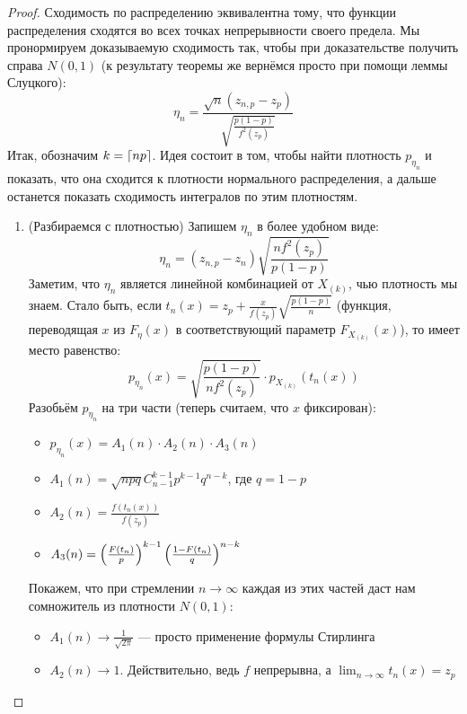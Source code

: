 \begin{proof}
	Сходимость по распределению эквивалентна тому, что функции распределения сходятся во всех точках непрерывности своего предела. Мы пронормируем доказываемую сходимость так, чтобы при доказательстве получить справа $N(0, 1)$ (к результату теоремы же вернёмся просто при помощи леммы Слуцкого):
	\[
		\eta_n = \frac{\sqrt{n}(z_{n, p} - z_p)}{\sqrt{\frac{p(1 - p)}{f^2(z_p)}}}
	\]
	Итак, обозначим $k = \left\lceil np\right\rceil$. Идея состоит в том, чтобы найти плотность $p_{\eta_n}$ и показать, что она сходится к плотности нормального распределения, а дальше останется показать сходимость интегралов по этим плотностям.
	\begin{enumerate}
		\item (Разбираемся с плотностью) Запишем $\eta_n$ в более удобном виде:
		\[
			\eta_n = (z_{n, p} - z_n)\sqrt{\frac{nf^2(z_p)}{p(1 - p)}}
		\]
		Заметим, что $\eta_n$ является линейной комбинацией от $X_{(k)}$, чью плотность мы знаем. Стало быть, если $t_n(x) = z_p + \frac{x}{f(z_p)}\sqrt{\frac{p(1 - p)}{n}}$ (функция, переводящая $x$ из $F_\eta(x)$ в соответствующий параметр $F_{X_{(k)}}(x)$), то имеет место равенство:
		\[
			p_{\eta_n}(x) = \sqrt{\frac{p(1 - p)}{nf^2(z_p)}} \cdot p_{X_{(k)}}(t_n(x))
		\]
		Разобьём $p_{\eta_n}$ на три части (теперь считаем, что $x$ фиксирован):
		\begin{itemize}
			\item $p_{\eta_n}(x) = A_1(n) \cdot A_2(n) \cdot A_3(n)$
			
			\item $A_1(n) = \sqrt{npq}C_{n - 1}^{k - 1}p^{k - 1}q^{n - k}$, где $q = 1 - p$
			
			\item $A_2(n) = \frac{f(t_n(x))}{f(z_p)}$
			
			\item $A_3(n) = \left(\frac{F(t_n)}{p}\right)^{k - 1}\left(\frac{1 - F(t_n)}{q}\right)^{n - k}$
		\end{itemize}
		Покажем, что при стремлении $n \to \infty$ каждая из этих частей даст нам сомножитель из плотности $N(0, 1)$:
		\begin{itemize}
			\item $A_1(n) \to \frac{1}{\sqrt{2\pi}}$ --- просто применение формулы Стирлинга
			
			\item $A_2(n) \to 1$. Действительно, ведь $f$ непрерывна, а $\lim_{n \to \infty} t_n(x) = z_p$
			

\end{itemize}
\end{enumerate}
\end{proof}
